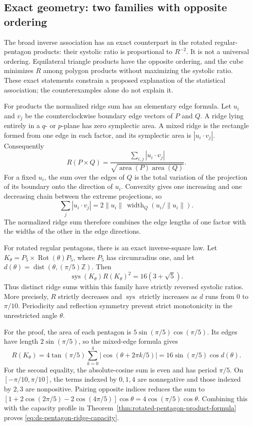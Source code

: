 \subsection{Exact geometry: two families with opposite ordering}

The broad inverse association has an exact counterpart in the rotated
regular-pentagon products: their systolic ratio is proportional to
$R^{-2}$. It is not a universal ordering. Equilateral triangle products
have the opposite ordering, and the cube minimizes $R$ among polygon
products without maximizing the systolic ratio. These exact statements
constrain a proposed explanation of the statistical association; the
counterexamples alone do not explain it.

For products the normalized ridge sum has an elementary edge formula. Let $u_i$ and $v_j$ be
the counterclockwise boundary edge vectors of $P$ and $Q$. A ridge lying entirely in a $q$-
or $p$-plane has zero symplectic area. A mixed ridge is the rectangle formed
from one edge in each factor, and its symplectic area is $|u_i\cdot v_j|$.
Consequently
\[
 R(P\times Q)=\frac{\sum_{i,j}|u_i\cdot v_j|}
                    {\sqrt{\operatorname{area}(P)\operatorname{area}(Q)}}.
\]
For a fixed $u_i$, the sum over the edges of $Q$ is the total variation of
the projection of its boundary onto the direction of $u_i$. Convexity gives
one increasing and one decreasing chain between the extreme projections,
so
\[
 \sum_j|u_i\cdot v_j|
 =2\|u_i\|\,\operatorname{width}_Q(u_i/\|u_i\|).
\]
The normalized ridge sum therefore combines the edge lengths of one factor with the
widths of the other in the edge directions.


For rotated regular pentagons, there is an exact inverse-square law. Let
$K_\theta=P_5\times\operatorname{Rot}(\theta)P_5$, where $P_5$ has
circumradius one, and let $d(\theta)=\operatorname{dist}(\theta,(\pi/5)\mathbb Z)$.
Then
\begin{equation}\label{eq:ds-pentagon-ridge-capacity}
 \operatorname{sys}(K_\theta)R(K_\theta)^2=16(3+\sqrt5).
\end{equation}
Thus distinct ridge sums within this family have strictly reversed
systolic ratios. More precisely, $R$ strictly decreases and
$\operatorname{sys}$ strictly increases as $d$ runs from $0$ to $\pi/10$.
Periodicity and reflection symmetry prevent strict monotonicity in the
unrestricted angle $\theta$.

For the proof, the area of each pentagon is $5\sin(\pi/5)\cos(\pi/5)$.
Its edges have length $2\sin(\pi/5)$, so the mixed-edge formula gives
\[
 R(K_\theta)=4\tan(\pi/5)\sum_{k=0}^4|\cos(\theta+2\pi k/5)|
           =16\sin(\pi/5)\cos d(\theta).
\]
For the second equality, the absolute-cosine sum is even and has period
$\pi/5$. On $[-\pi/10,\pi/10]$, the terms indexed by $0,1,4$ are
nonnegative and those indexed by $2,3$ are nonpositive. Pairing opposite
indices reduces the sum to
$[1+2\cos(2\pi/5)-2\cos(4\pi/5)]\cos\theta
=4\cos(\pi/5)\cos\theta$. Combining this with the capacity profile in
Theorem~\ref{thm:rotated-pentagon-product-formula} proves
\eqref{eq:ds-pentagon-ridge-capacity}.

